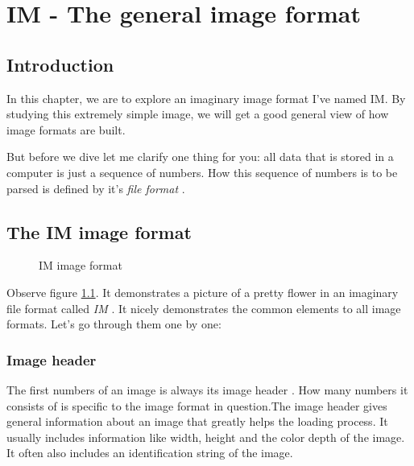\chapter{IM - The general image format}
\label{cha:im}

\begin{refsection}

  \section{Introduction}
  \label{sec:introduction}

  In this chapter, we are to explore an imaginary image format I've
  named IM. By studying this extremely simple image, we will get a
  good general view of how image formats are built.

  But before we dive let me clarify one thing for you: all data that
  is stored in a computer is just a sequence of numbers. How this
  sequence of numbers is to be parsed is defined by it's \textit{file
    format} .

  \section{The IM image format}
  \label{sec:general-image-format}

  \begin{figure}[h!]
    \centering
    \caption{IM image format}
    \label{fig:im}
  \end{figure}

  Observe figure \ref{fig:im}. It demonstrates a picture of a pretty
  flower in an imaginary file format called \textit{IM} . It
  nicely demonstrates the common elements to all image formats. Let's
  go through them one by one:

  \subsection{Image header}
  \label{sec:image-header}

  The first numbers of an image is always its image header
  . How many numbers it consists of is specific to
  the image format in question.The image header gives general
  information about an image that greatly helps the loading
  process. It usually includes information like width, height and the
  color depth of the image. It often also includes an identification
  string of the image.


\end{refsection}
